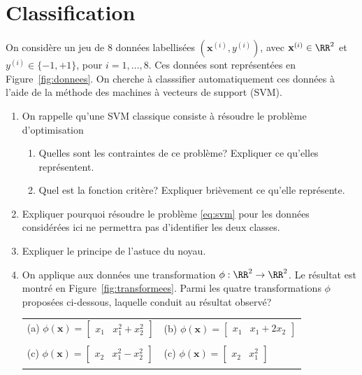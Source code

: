 \documentclass[11pt]{article}
\begin{document}
\section{Classification}
On considère un jeu de $8$ données labellisées $(\mathbf{x}^{(i)},y^{(i)})$, avec $\mathbf{x}^{(i)} \in \RR^2$ et $y^{(i)} \in \{-1,+1\}$, pour $i=1,\ldots,8$. Ces données sont représentées en Figure~\ref{fig:donnees}. On cherche à classsifier automatiquement ces données à l'aide de la méthode des machines à vecteurs de support (SVM).
\begin{enumerate}
	\item On rappelle qu'une SVM classique consiste à résoudre le problème d'optimisation
	\begin{enumerate}
		\item Quelles sont les contraintes de ce problème? Expliquer ce qu'elles représentent.
		\item Quel est la fonction critère? Expliquer brièvement ce qu'elle représente.
	\end{enumerate}
	
	\item Expliquer pourquoi résoudre le problème \eqref{eq:svm} pour les données considérées ici ne permettra pas d'identifier les deux classes.

\item Expliquer le principe de l'astuce du noyau.

\item On applique aux données une transformation $\phi:\RR^2\to\RR^2$. Le résultat est montré en Figure~\ref{fig:transformees}. Parmi les quatre transformations $\phi$ proposées ci-dessous, laquelle conduit au résultat observé?

\begin{tabular}{ll}
\\
	(a) $\displaystyle \phi(\mathbf{x}) = \begin{bmatrix} x_1 & x_1^2+x_2^2 \end{bmatrix}$
	&
	\qquad (b) $\displaystyle \phi(\mathbf{x}) = \begin{bmatrix} x_1 & x_1+2x_2 \end{bmatrix}$\\ \\
	(c) $\displaystyle \phi(\mathbf{x}) = \begin{bmatrix} x_2 & x_1^2-x_2^2 \end{bmatrix}$
	&
	\qquad (c) $\displaystyle \phi(\mathbf{x}) = \begin{bmatrix} x_2 & x_1^2 \end{bmatrix}$
	\\ \\
\end{tabular}


\end{enumerate}
\end{document}
